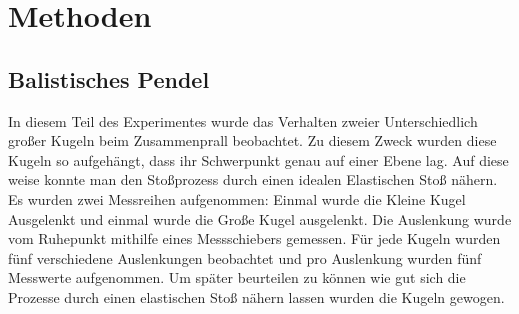 \section{Methoden}
\subsection*{Balistisches Pendel}
In diesem Teil des Experimentes wurde das Verhalten zweier Unterschiedlich großer Kugeln beim Zusammenprall beobachtet.
Zu diesem Zweck wurden diese Kugeln so aufgehängt, dass ihr Schwerpunkt genau auf einer Ebene lag.
Auf diese weise konnte man den Stoßprozess durch einen idealen Elastischen Stoß nähern.
Es wurden zwei Messreihen aufgenommen: Einmal wurde die Kleine Kugel Ausgelenkt und einmal wurde die Große Kugel ausgelenkt. Die Auslenkung wurde vom Ruhepunkt mithilfe eines Messschiebers gemessen.
Für jede Kugeln wurden fünf verschiedene Auslenkungen beobachtet und pro Auslenkung wurden fünf Messwerte aufgenommen.
Um später beurteilen zu können wie gut sich die Prozesse durch einen elastischen Stoß nähern lassen wurden die Kugeln gewogen.

